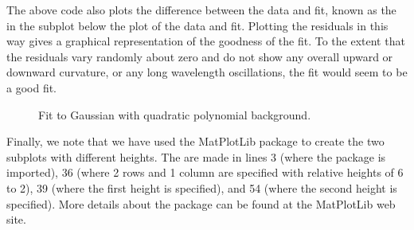 \documentclass[letterpaper,10pt,english]{sphinxmanual}
\begin{document}
\begin{sphinxVerbatim}[commandchars=\\\{\},numbers=left,firstnumber=1,stepnumber=1]
  \PYG{p}{[}\PYG{p}{]}
      
 
 
  

\end{sphinxVerbatim}

\sphinxAtStartPar
The above code also plots the difference between the data and fit, known as the  in the subplot below the plot of the data and fit.  Plotting the residuals in this way gives a graphical representation of the goodness of the fit.  To the extent that the residuals vary randomly about zero and do not show any overall upward or downward curvature, or any long wavelength oscillations, the fit would seem to be a good fit.

\begin{figure}[htbp]
\centering
\capstart

\noindent{}
\caption{Fit to Gaussian with quadratic polynomial background.}\label{\detokenize{chap8/chap8_fitting:id2}}\label{\detokenize{chap8/chap8_fitting:fig-fitspectrum}}\end{figure}

\sphinxAtStartPar
Finally, we note that we have used the MatPlotLib package  to create the two subplots with different heights.  The  are made in lines 3 (where the package is imported), 36 (where 2 rows and 1 column are specified with relative heights of 6 to 2), 39 (where the first  height is specified), and 54 (where the second  height is specified).  More details about the  package can be found at the MatPlotLib web site.
\end{document}
